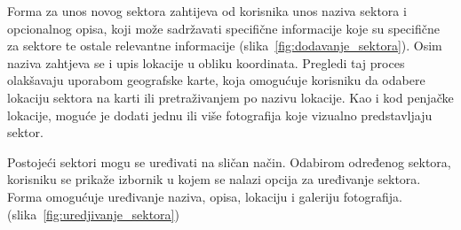 Forma za unos novog sektora zahtijeva od korisnika unos naziva sektora i opcionalnog opisa, koji može sadržavati specifične informacije koje su specifične za sektore te ostale relevantne informacije (slika~\ref{fig:dodavanje_sektora}). Osim naziva zahtjeva se i upis lokacije u obliku koordinata. Pregledi taj proces olakšavaju uporabom geografske karte, koja omogućuje korisniku da odabere lokaciju sektora na karti ili pretraživanjem po nazivu lokacije. Kao i kod penjačke lokacije, moguće je dodati jednu ili više fotografija koje vizualno predstavljaju sektor.

Postojeći sektori mogu se uređivati na sličan način. Odabirom određenog sektora, korisniku se prikaže izbornik u kojem se nalazi opcija za uređivanje sektora. Forma omogućuje uređivanje  naziva, opisa, lokaciju i galeriju fotografija. (slika~\ref{fig:uredjivanje_sektora})

